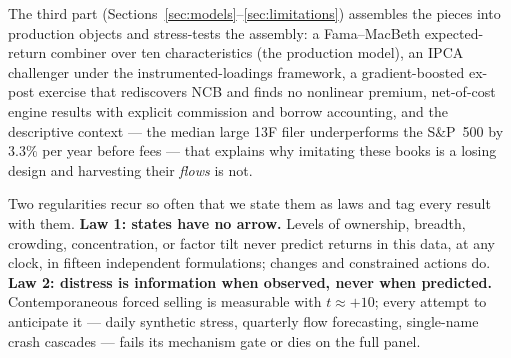 The third part (Sections~\ref{sec:models}--\ref{sec:limitations})
assembles the pieces into production objects and stress-tests the
assembly: a Fama--MacBeth expected-return combiner over ten
characteristics (the production model), an IPCA challenger under the
\citet{kps2019} instrumented-loadings framework, a gradient-boosted
ex-post exercise that rediscovers NCB and finds no nonlinear premium,
net-of-cost engine results with explicit commission and borrow
accounting, and the descriptive context --- the median large 13F
filer underperforms the S\&P~500 by $3.3\%$ per year before fees ---
that explains why imitating these books is a losing design and
harvesting their \emph{flows} is not.

Two regularities recur so often that we state them as laws and tag
every result with them. \textbf{Law 1: states have no arrow.} Levels
of ownership, breadth, crowding, concentration, or factor tilt never
predict returns in this data, at any clock, in fifteen independent
formulations; changes and constrained actions do. \textbf{Law 2:
distress is information when observed, never when predicted.}
Contemporaneous forced selling is measurable with $t\approx+10$;
every attempt to anticipate it --- daily synthetic stress, quarterly
flow forecasting, single-name crash cascades --- fails its mechanism
gate or dies on the full panel.
